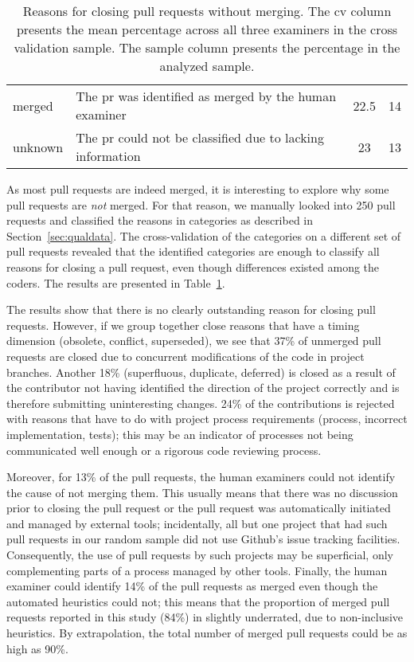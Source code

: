 \documentclass{sig-alternate}
\begin{document}
\begin{table}[t]
\begin{small}
\begin{tabular}{p{6em}p{14em}cc}
    \hline 
    \textsf{merged} & The {\sc pr} was identified as merged by the human
    examiner & 22.5 & 14\\

    \textsf{unknown} & The {\sc pr} could not be classified due to lacking
    information & 23 & 13 \\

    \hline
  \end{tabular}
\end{small}
\caption{Reasons for closing pull requests without merging. The {\sc cv} column
presents the mean percentage across all three examiners in the cross validation sample. The sample column presents the percentage in the analyzed sample.}
\label{tab:unmerged}
\end{table}

As most pull requests are indeed merged, it is interesting to explore why some
pull requests are \emph{not} merged. For that reason, we manually looked into 250 pull
requests and classified the reasons in categories as described in
Section~\ref{sec:qualdata}. The cross-validation of the categories on a
different set of pull requests revealed that the identified categories are
enough to classify all reasons for closing a pull request, even though
differences existed among the coders.  The results are presented in
Table~\ref{tab:unmerged}. 

The results show that there is no clearly outstanding reason for closing pull requests. However, if we group together close reasons that have a timing dimension (\textsf{obsolete}, \textsf{conflict}, \textsf{superseded}), we
see that 37\% of unmerged pull requests are closed due to concurrent
modifications of the code in project branches.
Another 18\% (\textsf{superfluous}, \textsf{duplicate}, \textsf{deferred}) is closed as a result of the contributor not having identified the direction of the project correctly and is therefore submitting uninteresting changes. 24\% of the
contributions is rejected with reasons that have to do with project process requirements (\textsf{process}, \textsf{incorrect implementation}, \textsf{tests}); this may be an indicator of processes not being communicated well enough or a rigorous code reviewing process.

Moreover, for 13\% of the pull requests, the human examiners could not identify
the cause of not merging them. This usually means that there was no discussion
prior to closing the pull request or the pull request was automatically
initiated and managed by external tools; incidentally, all but one project that
had such pull requests in our random sample did not use Github's issue tracking
facilities. Consequently, the use of pull requests by such projects may be
superficial, only complementing parts of a process managed by other tools.
Finally, the human examiner could identify 14\% of the pull requests as merged
even though the automated heuristics could not; this means that the proportion
of merged pull requests reported in this study (84\%) in slightly underrated,
due to non-inclusive heuristics. By extrapolation, the total number of merged
pull requests could be as high as 90\%.
\end{document}
